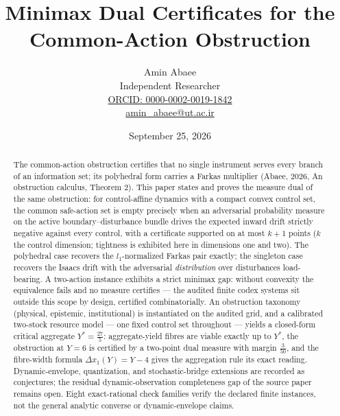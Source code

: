 \documentclass[10pt,twocolumn]{article}
\theoremstyle{definition}
\begin{document}
\title{Minimax Dual Certificates for the\\ Common-Action Obstruction}
\author{Amin Abaee\\[0.35em]
{\small Independent Researcher}\\[0.55em]
{\small\href{https://orcid.org/0000-0002-0019-1842}{ORCID: 0000-0002-0019-1842}}\\[0.3em]
{\small\href{mailto:amin\_abaee@ut.ac.ir}{amin\_abaee@ut.ac.ir}}}
\date{September 25, 2026}
\maketitle

\begin{abstract}
The common-action obstruction certifies that no single instrument serves
every branch of an information set; its polyhedral form carries a Farkas
multiplier (Abaee, 2026, An obstruction calculus, Theorem 2). This paper states and proves the
measure dual of the same obstruction: for control-affine dynamics with a
compact convex control set, the common safe-action set is empty precisely
when an adversarial probability measure on the active
boundary--disturbance bundle drives the expected inward drift strictly
negative against every control, with a certificate supported on at most
$k+1$ points ($k$ the control dimension; tightness is exhibited here in dimensions one and two). The
polyhedral case recovers the $l_1$-normalized Farkas pair exactly; the
singleton case recovers the Isaacs drift with the adversarial
\emph{distribution} over disturbances load-bearing. A two-action instance
exhibits a strict minimax gap: without convexity the equivalence fails and
no measure certifies --- the audited finite codex systems sit outside this
scope by design, certified combinatorially. An obstruction taxonomy
(physical, epistemic, institutional) is instantiated on the audited grid,
and a calibrated two-stock resource model --- one fixed control set
throughout --- yields a closed-form critical aggregate
$Y^{*} = \tfrac{27}{5}$: aggregate-yield fibres are viable exactly up to
$Y^{*}$, the obstruction at $Y = 6$ is certified by a two-point dual
measure with margin $\tfrac{3}{50}$, and the fibre-width formula
$\Delta x_{1}(Y) = Y - 4$ gives the aggregation rule its exact reading.
Dynamic-envelope, quantization, and stochastic-bridge extensions are
recorded as conjectures; the residual dynamic-observation completeness gap
of the source paper remains open. Eight exact-rational check families verify the declared finite
instances, not the general analytic converse or dynamic-envelope claims.
\end{abstract}
\end{document}
